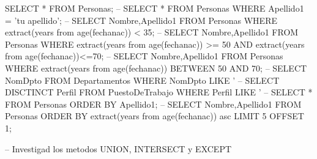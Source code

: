 \lstset{caption=Ejemplos de operadores,label=tab:selects}
\begin{SQL}
SELECT * FROM Personas;
-- SELECT * FROM Personas WHERE Apellido1 = 'tu apellido';
-- SELECT Nombre,Apellido1 FROM Personas WHERE extract(years from age(fechanac)) < 35;
-- SELECT Nombre,Apellido1 FROM Personas WHERE extract(years from age(fechanac)) >= 50 AND extract(years from age(fechanac))<=70;
-- SELECT Nombre,Apellido1 FROM Personas WHERE extract(years from age(fechanac)) BETWEEN 50 AND 70;
-- SELECT NomDpto FROM Departamentos WHERE NomDpto LIKE '%
-- SELECT DISCTINCT Perfil FROM PuestoDeTrabajo WHERE Perfil LIKE '%
-- SELECT * FROM Personas ORDER BY Apellido1;
-- SELECT Nombre,Apellido1 FROM Personas ORDER BY extract(years from age(fechanac)) asc LIMIT 5 OFFSET 1;

-- Investigad los metodos UNION, INTERSECT y EXCEPT
\end{SQL}
